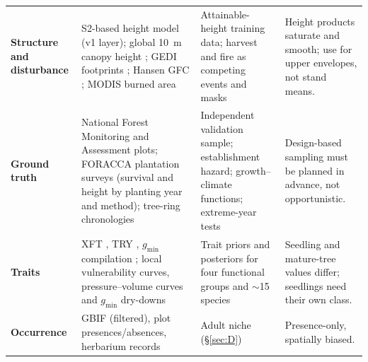 \begin{table}[t]
\begin{tabularx}{\linewidth}{@{}>{\raggedright\arraybackslash\bfseries\sffamily}p{2.15cm}>{\raggedright\arraybackslash}p{4.9cm}>{\raggedright\arraybackslash}X>{\raggedright\arraybackslash}p{4.0cm}@{}}
Structure and disturbance & S2-based height model (v1 layer); global 10~m canopy height \citep{Lang2023}; GEDI footprints \citep{Dubayah2020}; Hansen GFC \citep{Hansen2013}; MODIS burned area & Attainable-height training data; harvest and fire as competing events and masks & Height products saturate and smooth; use for upper envelopes, not stand means.\\
Ground truth & National Forest Monitoring and Assessment plots; FORACCA plantation surveys (survival and height by planting year and method); tree-ring chronologies \citep{Voss2025,Stepanyan2026,OpalaOwczarek2021} & Independent validation sample; establishment hazard; growth--climate functions; extreme-year tests & Design-based sampling must be planned in advance, not opportunistic.\\
Traits & XFT \citep{Choat2012}, TRY \citep{Kattge2020}, $g_{\min}$ compilation \citep{Duursma2019}; local vulnerability curves, pressure--volume curves and $g_{\min}$ dry-downs & Trait priors and posteriors for four functional groups and $\sim$15 species & Seedling and mature-tree values differ; seedlings need their own class.\\
Occurrence & GBIF (filtered), plot presences/absences, herbarium records & Adult niche (\S\ref{sec:D}) & Presence-only, spatially biased.\\
\bottomrule
\end{tabularx}
\end{table}

